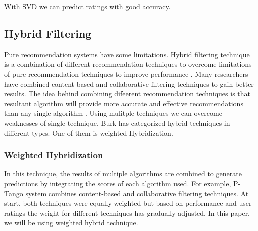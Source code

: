 \noindent With SVD we can predict ratings with good accuracy.




\subsection{Hybrid Filtering}
Pure recommendation systems have some limitations. Hybrid filtering technique is a combination of different recommendation techniques to overcome limitations of pure recommendation techniques to improve performance \cite{37,38}. Many researchers have combined content-based and collaborative filtering techniques to gain better results. The idea behind combining difeerent recommendation techniques is that resultant algorithm will provide more accurate and effective recommendations than any single algorithm \cite{39}. Using mulitple techniques we can overcome weaknesses of single technique. Burk \cite{} has categorized hybrid techniques in different types. One of them is weighted Hybridization.\\

\subsubsection{Weighted Hybridization}
In this technique, the results of multiple algorithms are combined to generate predictions by integrating the scores of each algorithm used. For example, \cite{41} P-Tango system combines content-based and collaborative filtering techniques. At start, both techniques were equally weighted but based on performance and user ratings the weight for different techniques has gradually adjusted. In this paper, we will be using weighted hybrid technique.



